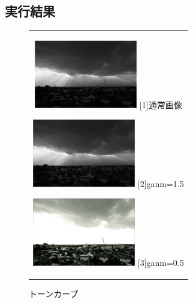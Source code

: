 \documentclass[a4paper,11pt,titlepage]{bxjsarticle}
\begin{document}
\subsection{実行結果}
\begin{figure}[htbp]
  \begin{center}
    \begin{tabular}{c}

      \begin{minipage}{0.33\hsize}
        \begin{center}
          \includegraphics[clip, width=4.5cm]{./sample2.jpg}
          \hspace{1.6cm} [1]通常画像
        \end{center}
      \end{minipage}

      \begin{minipage}{0.33\hsize}
        \begin{center}
          \includegraphics[clip, width=4.5cm]{./output6.jpg}
          \hspace{1.6cm} [2]ganm=1.5
        \end{center}
      \end{minipage}

      \begin{minipage}{0.33\hsize}
        \begin{center}
          \includegraphics[clip, width=4.5cm]{./output6_1.jpg}
          \hspace{1.6cm} [3]ganm=0.5
        \end{center}
      \end{minipage}

    \end{tabular}
    \caption{トーンカーブ}
    \label{fig:lena}
  \end{center}
\end{figure}
\end{document}
